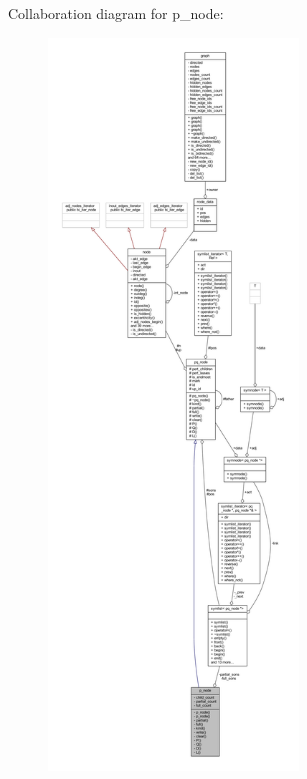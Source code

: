 Collaboration diagram for p\+\_\+node\+:\nopagebreak
\begin{figure}[H]
\begin{center}
\leavevmode
\includegraphics[height=550pt]{classp__node__coll__graph}
\end{center}
\end{figure}

